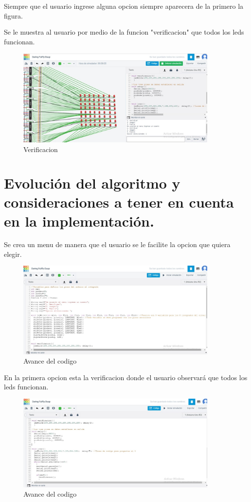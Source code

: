 \documentclass{article}
\begin{document}
Siempre que el usuario ingrese alguna opcion siempre aparecera de la primero la figura.

\newpage

Se le muestra al usuario por medio de la funcion "verificacion" que todos los leds funcionan.

\begin{figure}[h]
\includegraphics[width=10cm]{Verificacion.jpeg}
\centering

\caption{Verificacion}
\label{fig:Verificacion}
\end{figure}





\newpage
\section{Evolución del algoritmo y consideraciones a tener en cuenta en la implementación.}\label{intro}
Se crea un menu de manera que el usuario se le facilite la opcion que quiera elegir.

\begin{figure}[h]
\includegraphics[width=10cm]{Avance 1.jpeg}
\centering
\caption{Avance del codigo}
\label{fig:Avance 1}
\end{figure}

En la primera opcion esta la verificacion donde el usuario observará que todos los leds funcionan.
\newpage
\begin{figure}[h]
\includegraphics[width=10cm]{Avance 2.jpeg}
\centering
\caption{Avance del codigo}
\label{fig:Avance 2}
\end{figure}
\end{document}
